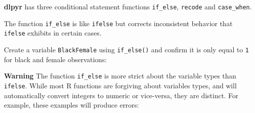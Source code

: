 \documentclass[]{book}
\newenvironment{Shaded}{\begin{snugshade}}{\end{snugshade}}
\newcommand{\CommentTok}[1]{\textcolor[rgb]{0.56,0.35,0.01}{\textit{#1}}}
\newcommand{\DataTypeTok}[1]{\textcolor[rgb]{0.13,0.29,0.53}{#1}}
\newcommand{\DecValTok}[1]{\textcolor[rgb]{0.00,0.00,0.81}{#1}}
\newcommand{\KeywordTok}[1]{\textcolor[rgb]{0.13,0.29,0.53}{\textbf{#1}}}
\newcommand{\NormalTok}[1]{#1}
\newcommand{\OperatorTok}[1]{\textcolor[rgb]{0.81,0.36,0.00}{\textbf{#1}}}
\newcommand{\OtherTok}[1]{\textcolor[rgb]{0.56,0.35,0.01}{#1}}
\newcommand{\StringTok}[1]{\textcolor[rgb]{0.31,0.60,0.02}{#1}}
\theoremstyle{definition}
\theoremstyle{definition}
\theoremstyle{definition}
\theoremstyle{remark}
\begin{document}
\textbf{dlpyr} has three conditional statement functions
\texttt{if\_else}, \texttt{recode} and \texttt{case\_when}.

The function \texttt{if\_else} is like \texttt{ifelse} but corrects
inconsistent behavior that \texttt{ifelse} exhibits in certain cases.

Create a variable \texttt{BlackFemale} using \texttt{if\_else()} and
confirm it is only equal to \texttt{1} for black and female
observations:

\begin{Shaded}
\end{Shaded}

\textbf{Warning} The function \texttt{if\_else} is more strict about the
variable types than \texttt{ifelse}. While most R functions are
forgiving about variables types, and will automatically convert integers
to numeric or vice-versa, they are distinct. For example, these examples
will produce errors:

\begin{Shaded}
\end{Shaded}
\end{document}
